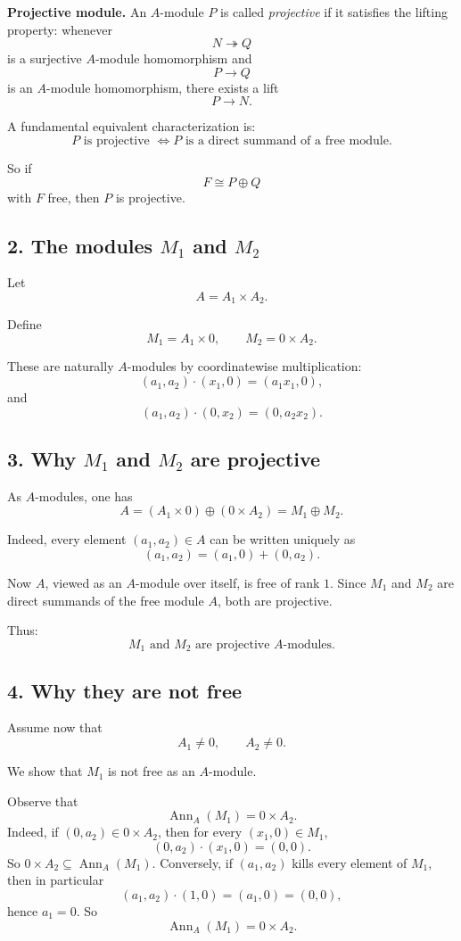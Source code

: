 \documentclass[12pt,a4paper]{article}
\theoremstyle{notespace}
\DeclareMathOperator{\Ann}{Ann}
\begin{document}
\textbf{Projective module.}
An \(A\)-module \(P\) is called \emph{projective} if it satisfies the lifting property: whenever
\[
N\twoheadrightarrow Q
\]
is a surjective \(A\)-module homomorphism and
\[
P\to Q
\]
is an \(A\)-module homomorphism, there exists a lift
\[
P\to N.
\]

A fundamental equivalent characterization is:
\[
P \text{ is projective }
\iff
P \text{ is a direct summand of a free module.}
\]

So if
\[
F\cong P\oplus Q
\]
with \(F\) free, then \(P\) is projective.

\subsection{2. The modules \(M_1\) and \(M_2\)}

Let
\[
A=A_1\times A_2.
\]

Define
\[
M_1=A_1\times 0,
\qquad
M_2=0\times A_2.
\]

These are naturally \(A\)-modules by coordinatewise multiplication:
\[
(a_1,a_2)\cdot (x_1,0)=(a_1x_1,0),
\]
and
\[
(a_1,a_2)\cdot (0,x_2)=(0,a_2x_2).
\]

\subsection{3. Why \(M_1\) and \(M_2\) are projective}

As \(A\)-modules, one has
\[
A=(A_1\times 0)\oplus (0\times A_2)=M_1\oplus M_2.
\]

Indeed, every element \((a_1,a_2)\in A\) can be written uniquely as
\[
(a_1,a_2)=(a_1,0)+(0,a_2).
\]

Now \(A\), viewed as an \(A\)-module over itself, is free of rank \(1\). Since \(M_1\) and \(M_2\) are direct summands of the free module \(A\), both are projective.

Thus:
\[
M_1 \text{ and } M_2 \text{ are projective }A\text{-modules.}
\]

\subsection{4. Why they are not free}

Assume now that
\[
A_1\neq 0,
\qquad
A_2\neq 0.
\]

We show that \(M_1\) is not free as an \(A\)-module.

Observe that
\[
\Ann_A(M_1)=0\times A_2.
\]
Indeed, if \((0,a_2)\in 0\times A_2\), then for every \((x_1,0)\in M_1\),
\[
(0,a_2)\cdot (x_1,0)=(0,0).
\]
So \(0\times A_2\subseteq \Ann_A(M_1)\). Conversely, if \((a_1,a_2)\) kills every element of \(M_1\), then in particular
\[
(a_1,a_2)\cdot (1,0)=(a_1,0)=(0,0),
\]
hence \(a_1=0\). So
\[
\Ann_A(M_1)=0\times A_2.
\]
\end{document}
